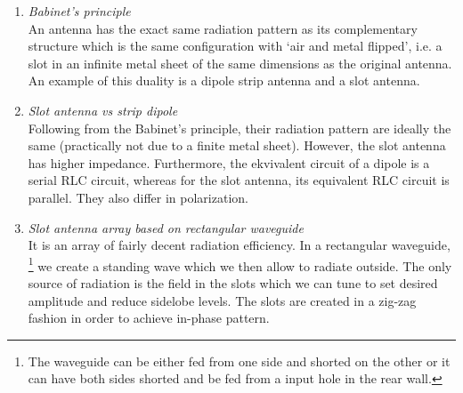 \documentclass[11pt,a4paper]{article}
\begin{document}
\begin{enumerate}
    \item \emph{Babinet's principle}\\
    An antenna has the exact same radiation pattern as its complementary structure which is the same configuration with `air and metal flipped', i.e. a slot in an infinite metal sheet of the same dimensions as the original antenna. An example of this duality is a dipole strip antenna and a slot antenna.
    
    \item \emph{Slot antenna vs strip dipole}\\
    Following from the Babinet's principle, their radiation pattern are ideally the same (practically not due to a finite metal sheet). However, the slot antenna has higher impedance. Furthermore, the ekvivalent circuit of a dipole is a serial RLC circuit, whereas for the slot antenna, its equivalent RLC circuit is parallel. They also differ in polarization.
    
    \item \emph{Slot antenna array based on rectangular waveguide}\\
    It is an array of fairly decent radiation efficiency. In a rectangular waveguide,%
        \footnote{The waveguide can be either fed from one side and shorted on the other or it can have both sides shorted and be fed from a input hole in the rear wall.}
    we create a standing wave which we then allow to radiate outside. The only source of radiation is the field in the slots which we can tune to set desired amplitude and reduce sidelobe levels. The slots are created in a zig-zag fashion in order to achieve in-phase pattern.
    

\end{enumerate}
\end{document}
